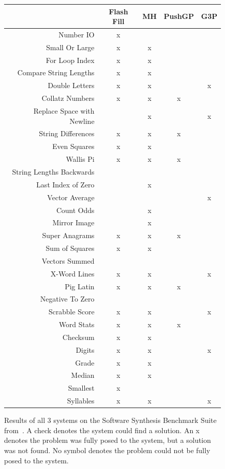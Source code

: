\begin{figure}
\begin{tabular}{ r | c c c c }
	& Flash Fill & MH & PushGP & G3P \\
	\hline
	Number IO & x & \checkmark & \checkmark & \checkmark \\
	Small Or Large & x & x & \checkmark & \checkmark \\
	For Loop Index & x & x & \checkmark & \checkmark \\
	Compare String Lengths & x & x & \checkmark & \checkmark \\
	Double Letters & x & x & \checkmark & x \\
	Collatz Numbers & x & x & x \\
	Replace Space with Newline &   & x & \checkmark & x \\
	String Differences & x & x & x \\
	Even Squares & x & x & \checkmark & \checkmark \\
	Wallis Pi & x & x & x \\
	String Lengths Backwards &   & \checkmark  & \checkmark & \checkmark \\
	Last Index of Zero &  & x & \checkmark & \checkmark \\
	Vector Average &  & \checkmark & \checkmark & x \\
	Count Odds &  & x & \checkmark & \checkmark \\
	Mirror Image &  & x & \checkmark & \checkmark \\
	Super Anagrams & x & x & x & \checkmark \\
	Sum of Squares & x & x & \checkmark & \checkmark \\
	Vectors Summed &  & \checkmark & \checkmark & \checkmark \\
	X-Word Lines & x & x & \checkmark & x \\
	Pig Latin & x & x & x  \\
	Negative To Zero &  & \checkmark & \checkmark & \checkmark \\
	Scrabble Score & x & x & \checkmark & x \\
	Word Stats & x & x & x \\
	Checksum & x & x & \checkmark \\
	Digits & x & x & \checkmark & x \\
	Grade & x & x & \checkmark & \checkmark  \\
	Median & x & x & \checkmark & \checkmark \\
	Smallest & x & \checkmark & \checkmark & \checkmark \\
	Syllables & x & x & \checkmark & x \\
\end{tabular}
\caption{Results of all 3 systems on the Software Synthesis Benchmark Suite from~\cite{Helmuth2015b}. A check denotes the system could find a solution. An x denotes the problem was fully posed to the system, but a solution was not found. No symbol denotes the problem could not be fully posed to the system.}
\label{fig:results2}
\end{figure}

